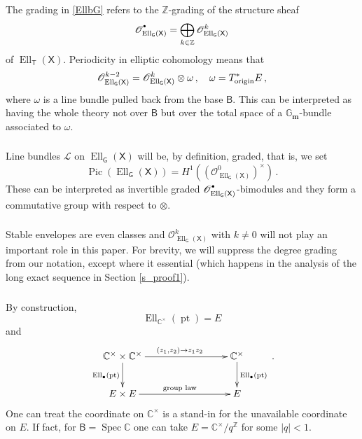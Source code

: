 \documentclass[14pt]{extarticle}
\newcommand{\cOd}{{\cO}^{\raisebox{0.5mm}{$\scriptscriptstyle \bullet$}}}
\newcommand{\C}{\mathbb{C}}
\newcommand{\Gm}{\mathbb{G}_\mathbf{m}}
\newcommand{\Ct}{\mathbb{C}^\times}
\newcommand{\Z}{\mathbb{Z}}
\newcommand{\bT}{\mathsf{T}}
\newcommand{\bG}{\mathsf{G}}
\newcommand{\bB}{\mathsf{B}}
\newcommand{\bX}{\mathsf{X}}
\newcommand{\cL}{\mathscr{L}}
\newcommand{\cO}{\mathscr{O}}
\DeclareMathOperator{\Ell}{Ell}
\DeclareMathOperator{\pt}{pt}
\DeclareMathOperator{\Pic}{Pic}
\DeclareMathOperator{\Spec}{Spec}
\theoremstyle{definition}
\begin{document}
\subsubsection{}

The grading in \eqref{EllbG} refers to the $\Z$-grading of the
structure sheaf
%
\begin{equation}
\cOd_{\Ell_\bG(\bX)} = \bigoplus_{k\in \Z}
\cO^k_{\Ell_\bG(\bX)}\label{cOd}
\end{equation}
%
of $\Ell_\bT(\bX)$. Periodicity in elliptic cohomology means that
$$
\cO^{k-2}_{\Ell_\bG(\bX)} = \cO^{k}_{\Ell_\bG(\bX)} \otimes \omega \,,
\quad  
\omega= T^*_\textup{origin} E  \,, 
$$
where  $\omega$ is a line bundle pulled back from the base $\bB$. This
can be interpreted as having the whole theory not over $\bB$ but over the
total space of a $\Gm$-bundle associated to $\omega$.

\subsubsection{}

Line bundles $\cL$ on $\Ell_{\bG}(\bX)$ will be, by definition, graded,
that is, we set 
%
\begin{equation}
\Pic(\Ell_{\bG}(\bX)) = H^1\left(
  \left(\cO^{0}_{\Ell_\bG(\bX)} \right)^\times \right) \,.\label{defPic}
\end{equation}
%
These can be interpreted as invertible graded 
$\cOd_{\Ell_\bG(\bX)}$-bimodules and they
form a commutative group with respect to $\otimes$.

\subsubsection{} 

Stable envelopes are even classes and $\cO^{k}_{\Ell_\bG(\bX)}$ with
$k\ne 0$ will not play an important role in this paper. For brevity,
we will suppress the degree grading from our notation, except where it
essential 
(which happens 
in the analysis of the long exact sequence in Section \ref{s_proof1}).





\subsubsection{}

By construction, 
$$
\Ell_{\Ct}(\pt) = E 
$$
and
%
\begin{equation}
  \label{groupl}
  \xymatrix{
    \Ct \times \Ct \ar[rrr]^{ (z_1,z_2) \to z_1z_2}
    \ar[d]_{\Ell_{\bullet}(\pt)}&&&   \Ct
    \ar[d]^{\Ell_{\bullet}(\pt)}\\
    E \times E \ar[rrr]^{\textup{group law}}&&& E
  } \,. 
\end{equation}
%
One can treat the coordinate on $\Ct$ is a stand-in for the unavailable coordinate on
$E$. If fact, for $\bB=\Spec\C$ one can take $E=\Ct/q^\Z$ for some
$|q|<1$.
\end{document}
